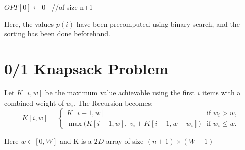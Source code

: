 \documentclass{article}
\begin{document}
	\begin{algorithm}[H]
		\SetAlgoLined
		\caption{Solution}
		$OPT[0] \leftarrow 0$ \, //of size n+1 \;
		\For{$i \leftarrow 1$ to $n$ }{
			$OPT[i] = max(OPT[i-1], v_i + OPT[p[(i)])$
		}
	\end{algorithm}
	\vspace{2mm}
	Here, the values $p(i)$ have been precomputed using binary search, and the sorting has been done beforehand.
	
	\section{0/1 Knapsack Problem}
	
	\begin{algorithm}[H]
		\SetAlgoLined
		\caption{Problem: 0/1 Knapsack}
	\end{algorithm}
	\vspace{5mm}
	
	Let $K[i,w]$ be the maximum value achievable using the first $i$ items with a combined weight of $w_i$. The Recursion becomes:
	\[
	K[i,w] =
	\begin{cases}
		K[i-1,w] & \text{if } w_i > w, \\[6pt]
		\max\big(K[i-1,w], \; v_i + K[i-1,w-w_i]\big) & \text{if } w_i \le w.
	\end{cases}
	\]
	
	Here $w \in [0,W]$ and K is a $2D$ array of size $(n+1) \times (W+1)$
	\vspace{2mm}
	
	\begin{algorithm}[H]
		\SetAlgoLined
		\caption{Solution}
		 \;
		 \;

		
	\end{algorithm}
	
\end{document}
